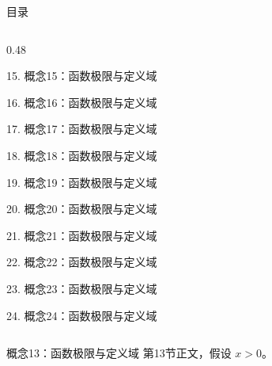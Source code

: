 \documentclass[aspectratio=169,10pt,fontset=fandol]{ctexbeamer}
\begin{document}
\begin{frame}[t,fragile]{目录}
\begin{columns}[T,onlytextwidth]
\begin{column}{0.48\textwidth}
{\color{gray!40}\small 15. 概念15：函数极限与定义域\par}\vspace{0.22em}
{\color{gray!40}\small 16. 概念16：函数极限与定义域\par}\vspace{0.22em}
{\color{gray!40}\small 17. 概念17：函数极限与定义域\par}\vspace{0.22em}
{\color{gray!40}\small 18. 概念18：函数极限与定义域\par}\vspace{0.22em}
{\color{gray!40}\small 19. 概念19：函数极限与定义域\par}\vspace{0.22em}
{\color{gray!40}\small 20. 概念20：函数极限与定义域\par}\vspace{0.22em}
{\color{gray!40}\small 21. 概念21：函数极限与定义域\par}\vspace{0.22em}
{\color{gray!40}\small 22. 概念22：函数极限与定义域\par}\vspace{0.22em}
{\color{gray!40}\small 23. 概念23：函数极限与定义域\par}\vspace{0.22em}
{\color{gray!40}\small 24. 概念24：函数极限与定义域\par}\vspace{0.22em}
\end{column}
\end{columns}
\end{frame}
\begin{frame}[t,fragile]{概念13：函数极限与定义域}
\normalsize
{\normalsize
第13节正文，假设 $x>0$。
}
\end{frame}
\end{document}
